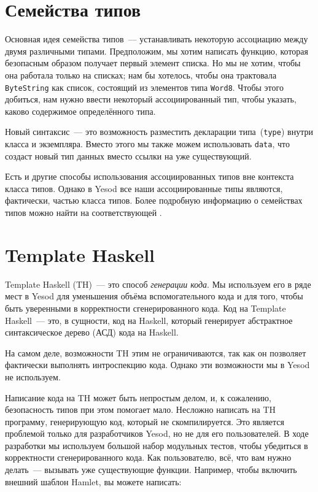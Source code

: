 \section{Семейства типов}

Основная идея семейства типов~--- устанавливать некоторую ассоциацию между двумя различными типами. Предположим, мы хотим написать функцию, которая безопасным образом получает первый элемент списка. Но мы не хотим, чтобы она работала только на списках; нам бы хотелось, чтобы она трактовала \lstinline'ByteString' как список, состоящий из элементов типа \lstinline'Word8'. Чтобы этого добиться, нам нужно ввести некоторый ассоциированный тип, чтобы указать, каково содержимое определённого типа.


Новый синтаксис~--- это возможность разместить декларации типа~(\lstinline'type') внутри класса и экземпляра. Вместо этого мы также можем использовать \lstinline'data', что создаст новый тип данных вместо ссылки на уже существующий.

\begin{remark}
Есть и другие способы использования ассоциированных типов вне контекста класса типов. Однако в Yesod все наши ассоциированные типы являются, фактически, частью класса типов. Более подробную информацию о семействах типов можно найти на соответствующей .
\end{remark}

\section{Template Haskell}

Template Haskell (TH)~--- это способ \emph{генерации кода}. Мы используем его в ряде мест в Yesod для уменьшения объёма вспомогательного кода и для того, чтобы быть уверенными в корректности сгенерированного кода. Код на Template Haskell~--- это, в сущности, код на Haskell, который генерирует абстрактное синтаксическое дерево (АСД) кода на Haskell.

\begin{remark}
На самом деле, возможности TH этим не ограничиваются, так как он позволяет фактически выполнять интроспекцию кода. Однако эти возможности мы в Yesod не используем.
\end{remark}

Написание кода на TH может быть непростым делом, и, к сожалению, безопасность типов при этом помогает мало. Несложно написать на TH программу, генерирующую код, который не скомпилируется. Это является проблемой только для разработчиков Yesod, но не для его пользователей. В ходе разработки мы используем большой набор модульных тестов, чтобы убедиться в корректности сгенерированного кода. Как пользователю, всё, что вам нужно делать~--- вызывать уже существующие функции. Например, чтобы включить внешний шаблон Hamlet, вы можете написать:

